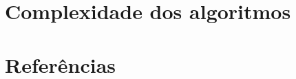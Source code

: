 \documentclass[12pt]{article}
\begin{document}

\section{Complexidade dos algoritmos}

\section{Referências}
\end{document}
